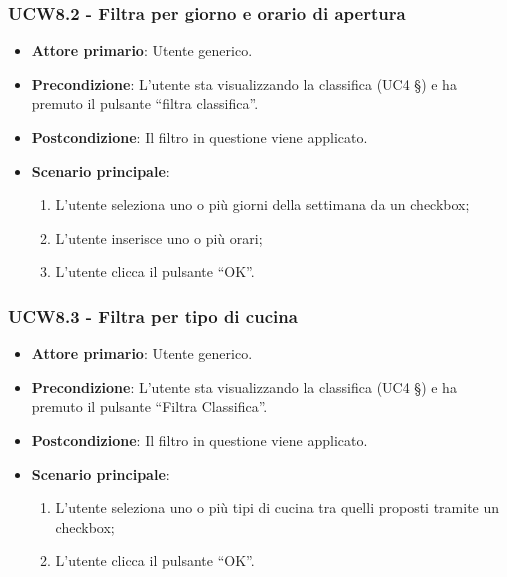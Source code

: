 \subsubsection{UCW8.2 - Filtra per giorno e orario di apertura}
\begin{itemize}
    \item \textbf{Attore primario}: Utente generico.
    \item \textbf{Precondizione}: L’utente sta visualizzando la classifica (UC4 §) e ha premuto il pulsante “filtra classifica”.
    \item \textbf{Postcondizione}: Il filtro in questione viene applicato.
    \item \textbf{Scenario principale}: 
    \begin{enumerate}
        \item L’utente seleziona uno o più giorni della settimana da un checkbox;
        \item L’utente inserisce uno o più orari;
        \item L’utente clicca il pulsante “OK”.
    \end{enumerate}
\end{itemize}

\subsubsection{UCW8.3 - Filtra per tipo di cucina}
\begin{itemize}
    \item \textbf{Attore primario}: Utente generico.
    \item \textbf{Precondizione}: L’utente sta visualizzando la classifica (UC4 §) e ha premuto il pulsante “Filtra Classifica”.
    \item \textbf{Postcondizione}: Il filtro in questione viene applicato.
    \item \textbf{Scenario principale}: 
    \begin{enumerate}
        \item L’utente seleziona uno o più tipi di cucina tra quelli proposti tramite un checkbox;
        \item L’utente clicca il pulsante “OK”.
    \end{enumerate}
\end{itemize}

